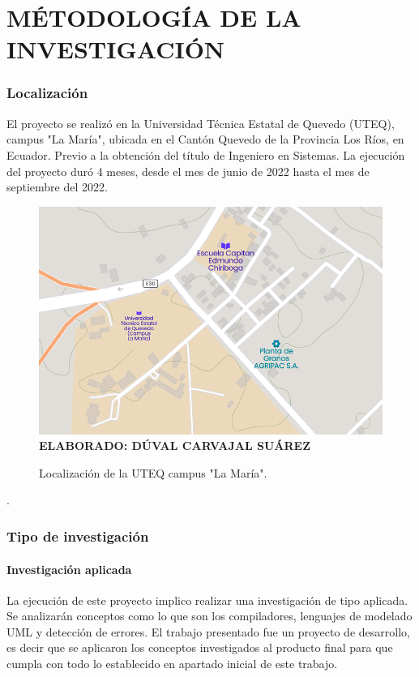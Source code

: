 \setcounter{chapter}{3}
\setcounter{section}{0}
\part{MÉTODOLOGÍA DE LA INVESTIGACIÓN} 

\section{Localización}

El proyecto se realizó en la Universidad Técnica Estatal de Quevedo (UTEQ), campus "La María", ubicada en el Cantón Quevedo de la Provincia Los Ríos, en Ecuador. Previo a la obtención del título de Ingeniero en Sistemas. La ejecución del proyecto duró 4 meses, desde el mes de junio de 2022 hasta el mes de septiembre del 2022.

\begin{figure}[h!]
	\caption{Localización de la UTEQ campus "La María".}
	\includegraphics[width=12cm]{img/campuslamaria.png}
	\label{fig:lamaria}
	\textbf{\\ ELABORADO: DÚVAL CARVAJAL SUÁREZ}
\end{figure}.

\section{Tipo de investigación}

\subsection{Investigación aplicada}

La ejecución de este proyecto implico realizar una investigación de tipo aplicada. Se analizarán conceptos como lo que son los compiladores, lenguajes de modelado UML y detección de errores. El trabajo presentado fue un proyecto de desarrollo, es decir que se aplicaron los conceptos investigados al producto final para que cumpla con todo lo establecido en apartado inicial de este trabajo.

